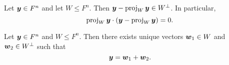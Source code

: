 \begin{Thm}\label{perp} Let $\boldsymbol y \in F^n$ and let $W\le F^n$. Then $\boldsymbol y - \operatorname{proj}_W\boldsymbol y\in W^{\perp}$. In particular,
\[\operatorname{proj}_W \boldsymbol y\cdot (\boldsymbol y - \operatorname{proj}_W \boldsymbol y) = 0.\]
\end{Thm}\vs

\begin{Thm} Let $\boldsymbol y \in F^n$ and $W \le F^n$. Then there exists unique vectors $\boldsymbol w_1\in W$ and $\boldsymbol w_2\in W^\perp$ such that 
\[\boldsymbol y = \boldsymbol w_1 + \boldsymbol w_2.\] 
\end{Thm}\vs

